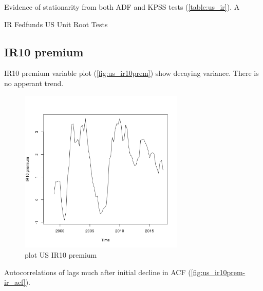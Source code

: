 \documentclass[10pt]{article}
\begin{document}
Evidence of stationarity from both ADF and KPSS tests (\autoref{table:us_ir}). A

\begin{table}[h!]
\centering
{}
\caption{IR Fedfunds US Unit Root Tests}
\label{table:us_ir}
\end{table}

\subsection{IR10 premium}

IR10 premium variable plot (\autoref{fig:us_ir10prem}) show decaying variance. There is no apperant trend.

\begin{figure}[h!]
\centering
\includegraphics[width = 0.7\textwidth]{"../plots/us_IR10 premium"}
\caption{plot US IR10 premium}
\label{fig:us_ir10prem}
\end{figure}

Autocorrelations of lags much after initial decline in ACF (\autoref{fig:us_ir10prem-ir_acf}).
\end{document}

